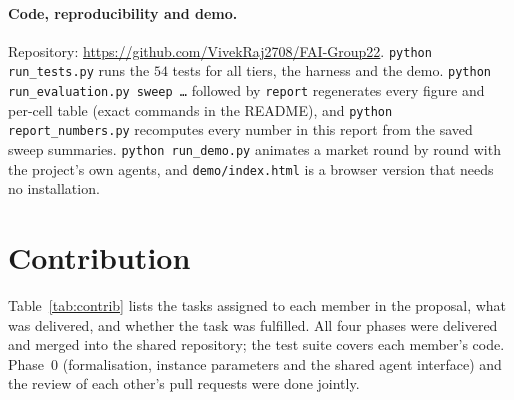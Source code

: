 \documentclass{article}
\theoremstyle{definition}
\begin{document}
\paragraph{Code, reproducibility and demo.} Repository:
\url{https://github.com/VivekRaj2708/FAI-Group22}. \texttt{python run\_tests.py} runs the $54$ tests for all
tiers, the harness and the demo. \texttt{python run\_evaluation.py sweep \dots} followed by
\texttt{report} regenerates every figure and per-cell table (exact commands in the README), and
\texttt{python report\_numbers.py} recomputes every number in this report from the saved sweep summaries.
\texttt{python run\_demo.py} animates a market round by round with the project's own agents, and
\texttt{demo/index.html} is a browser version that needs no installation.

\section{Contribution}\label{sec:contrib}
Table~\ref{tab:contrib} lists the tasks assigned to each member in the proposal, what was delivered, and
whether the task was fulfilled. All four phases were delivered and merged into the shared repository; the
test suite covers each member's code. Phase~0 (formalisation, instance parameters and the shared agent
interface) and the review of each other's pull requests were done jointly.
\end{document}
